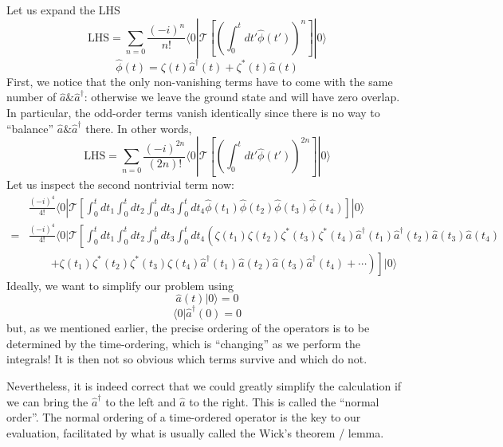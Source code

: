 Let us expand the LHS
\[ \mathrm{LHS}=\sum_{n=0}{\frac{\left( -i \right) ^n}{n!}\langle 0|\mathcal{T} \left[ \left( \int_0^t{dt'\hat{\phi}\left( t' \right)} \right) ^n \right] |0\rangle}\]
\[ \hat{\phi}\left( t \right) =\zeta \left( t \right) \hat{a}^{\dagger}\left( t \right) +\zeta ^*\left( t \right) \hat{a}\left( t \right) \]
First, we notice that the only non-vanishing terms have to come with the same number of $\hat{a}\& \hat{a}^\dagger$: otherwise we leave the ground state and will have zero overlap. In particular, the odd-order terms vanish identically since there is no way to ``balance'' $\hat{a}\&\hat{a}^{\dagger}$ there. In other words,
\[ \mathrm{LHS}=\sum_{n=0}{\frac{\left( -i \right) ^{2n}}{\left( 2n \right) !}\langle 0|\mathcal{T} \left[ \left( \int_0^t{dt'\hat{\phi}\left( t' \right)} \right) ^{2n} \right] |0\rangle}\]
Let us inspect the second nontrivial term now:
\begin{align*}
    &\frac{\left( -i \right) ^4}{4!}\langle 0|\mathcal{T} \left[ \int_0^t{dt_1\int_0^t{dt_2\int_0^t{dt_3\int_0^t{dt_4\hat{\phi}\left( t_1 \right) \hat{\phi}\left( t_2 \right) \hat{\phi}\left( t_3 \right) \hat{\phi}\left( t_4 \right)}}}} \right] |0\rangle \\
    =&\frac{\left( -i \right) ^4}{4!}\langle 0|\mathcal{T} \left[ \int_0^t{dt_1\int_0^t{dt_2\int_0^t{dt_3\int_0^t{dt_4\left( \zeta \left( t_1 \right) \zeta \left( t_2 \right) \zeta ^*\left( t_3 \right) \zeta ^*\left( t_4 \right) \hat{a}^{\dagger}\left( t_1 \right) \hat{a}^{\dagger}\left( t_2 \right) \hat{a}\left( t_3 \right) \hat{a}\left( t_4 \right) \right.}}}} \right. \\
    &\qquad \left. \left. +\zeta \left( t_1 \right) \zeta ^*\left( t_2 \right) \zeta ^*\left( t_3 \right) \zeta \left( t_4 \right) \hat{a}^{\dagger}\left( t_1 \right) \hat{a}\left( t_2 \right) \hat{a}\left( t_3 \right) \hat{a}^{\dagger}\left( t_4 \right) +\cdots \right) \right] |0\rangle
\end{align*}
Ideally, we want to simplify our problem using
\[ \hat{a}\left( t \right) |0\rangle =0\]
\[ \langle 0|\hat{a}^{\dagger}\left( 0 \right) =0\]
but, as we mentioned earlier, the precise ordering of the operators is to be determined by the time-ordering, which is ``changing'' as we perform the integrals! It is then not so obvious which terms survive and which do not.

Nevertheless, it is indeed correct that we could greatly simplify the calculation if we can bring the $\hat{a}^\dagger$ to the left and $\hat{a}$ to the right. This is called the ``normal order''. The normal ordering of a time-ordered operator is the key to our evaluation, facilitated by what is usually called the Wick's theorem / lemma.

